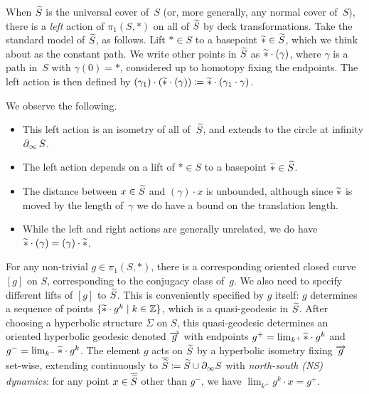 \begin{definition}
When $\widetilde{S}$ is the universal cover of~$S$ (or, more generally, any
normal cover of~$S$), there is a \emph{left} action of $\pi_1(S,\ast)$
on all of $\widetilde{S}$ by deck transformations. Take
the standard model of $\widetilde{S}$, as follows. Lift $\ast \in S$ to a basepoint
$\widetilde{\ast} \in \widetilde{S}$, which we think about as the constant path. We
write other
points in $\widetilde{S}$ as $\widetilde{\ast} \cdot (\gamma)$, where $\gamma$ is a
path in~$S$ with $\gamma(0) = \ast$, considered up to homotopy fixing
the endpoints. The left action is then
defined by
$(\gamma_1) \cdot (\widetilde{\ast} \cdot (\gamma)) \coloneqq
\widetilde{\ast} \cdot (\gamma_1 \cdot \gamma)$.
\end{definition}

We observe the following.
\begin{itemize}
\item This left action is an isometry of all of~$\widetilde{S}$, and extends
  to the circle at infinity $\operatorname{\partial}_\infty S$.
\item The left action depends on a lift of
  $\ast \in S$ to a basepoint  $\widetilde{\ast} \in \widetilde{S}$.
\item The distance between $x \in \widetilde{S}$ and $(\gamma) \cdot x$
  is unbounded, although since $\widetilde{\ast}$ is moved by the
  length of~$\gamma$ we do have a bound on
  the translation length.
\item While the left and right actions are generally unrelated, we do
  have $\widetilde{\ast} \cdot (\gamma) = (\gamma) \cdot \widetilde{\ast}$.
\end{itemize}

For any non-trivial $g \in \pi_1(S,*)$, there is a corresponding
oriented closed curve $[g]$ on $S$, corresponding to the conjugacy
class of~$g$. We also need to specify different lifts of $[g]$ to
$\widetilde{S}$. This is conveniently specified by $g$ itself: $g$ determines
a sequence of points $\{\widetilde{\ast} \cdot g^k \mid k \in \mathbb{Z}\}$,
which is a
quasi-geodesic in $\widetilde{S}$. After choosing a hyperbolic structure
$\Sigma$ on $S$, this quasi-geodesic determines an oriented hyperbolic
geodesic
denoted $\overrightarrow{g}$ with endpoints $g^+ = \lim_{k^+} \widetilde{\ast} \cdot g^k$ 
and $g^- = \lim_{k^-} \widetilde{\ast} \cdot g^k$.
The element $g$ acts on $\widetilde{S}$ by a hyperbolic isometry
fixing $\overrightarrow{g}$ set-wise, extending continuously to
$\overline{\widetilde{S}} \coloneqq \widetilde{S} \cup \partial_{\infty} S$ with \emph{north-south (NS) dynamics}: for any point
$x \in \overline{\widetilde{S}}$ other
than $g^-$, we have $\lim _{k^+} g^k \cdot x = g^+$.

